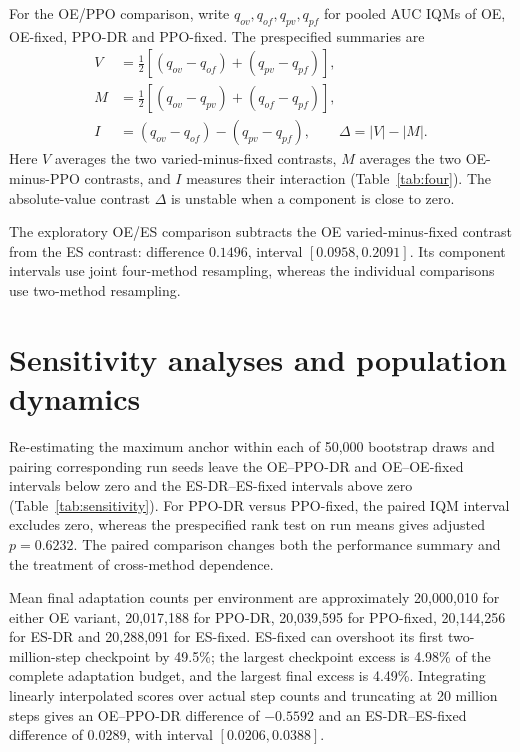 For the OE/PPO comparison, write $q_{ov},q_{of},q_{pv},q_{pf}$ for pooled AUC IQMs of OE, OE-fixed, PPO-DR and PPO-fixed. The prespecified summaries are
\begin{align}
 V&=\tfrac12[(q_{ov}-q_{of})+(q_{pv}-q_{pf})],\\
 M&=\tfrac12[(q_{ov}-q_{pv})+(q_{of}-q_{pf})],\\
 I&=(q_{ov}-q_{of})-(q_{pv}-q_{pf}),\qquad
 \Delta=|V|-|M|.
\end{align}
Here $V$ averages the two varied-minus-fixed contrasts, $M$ averages the two OE-minus-PPO contrasts, and $I$ measures their interaction (Table~\ref{tab:four}). The absolute-value contrast $\Delta$ is unstable when a component is close to zero.

The exploratory OE/ES comparison subtracts the OE varied-minus-fixed contrast from the ES contrast: difference $0.1496$, interval $[0.0958,0.2091]$. Its component intervals use joint four-method resampling, whereas the individual comparisons use two-method resampling.




\section{Sensitivity analyses and population dynamics}
\label{app:diagnostics}
Re-estimating the maximum anchor within each of 50,000 bootstrap draws and pairing corresponding run seeds leave the OE--PPO-DR and OE--OE-fixed intervals below zero and the ES-DR--ES-fixed intervals above zero (Table~\ref{tab:sensitivity}). For PPO-DR versus PPO-fixed, the paired IQM interval excludes zero, whereas the prespecified rank test on run means gives adjusted $p=0.6232$. The paired comparison changes both the performance summary and the treatment of cross-method dependence.



Mean final adaptation counts per environment are approximately 20,000,010 for either OE variant, 20,017,188 for PPO-DR, 20,039,595 for PPO-fixed, 20,144,256 for ES-DR and 20,288,091 for ES-fixed. ES-fixed can overshoot its first two-million-step checkpoint by 49.5\%; the largest checkpoint excess is 4.98\% of the complete adaptation budget, and the largest final excess is 4.49\%. Integrating linearly interpolated scores over actual step counts and truncating at 20 million steps gives an OE--PPO-DR difference of $-0.5592$ and an ES-DR--ES-fixed difference of $0.0289$, with interval $[0.0206,0.0388]$.

